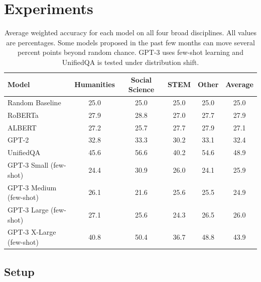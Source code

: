 \documentclass{article}
\begin{document}
\section{Experiments}

\begin{table}[b]
\setlength{\tabcolsep}{9pt}
\vspace{-5pt}
\fontsize{10}{11}\selectfont
\centering
\begin{tabular}{lcccc|c}
Model       & Humanities & Social Science & STEM & Other &  Average \\
\hline
Random Baseline & 25.0 & 25.0 & 25.0 & 25.0 & 25.0 \\
RoBERTa           & 27.9 & 28.8 & 27.0 & 27.7 & 27.9 \\
ALBERT           & 27.2 & 25.7 & 27.7 & 27.9 & 27.1 \\
GPT-2           & 32.8 & 33.3 & 30.2 & 33.1 & 32.4 \\
UnifiedQA       & 45.6 & 56.6 & 40.2 & 54.6 & 48.9 \\
GPT-3 Small (few-shot)     & 24.4 & 30.9 & 26.0 & 24.1 & 25.9 \\
GPT-3 Medium (few-shot)   & 26.1 & 21.6 & 25.6 & 25.5 & 24.9 \\
GPT-3 Large (few-shot)     & 27.1 & 25.6 & 24.3 & 26.5 & 26.0 \\
GPT-3 X-Large (few-shot)   & 40.8 & 50.4 & 36.7 & 48.8 & 43.9 \\
\hline
\end{tabular}
\caption{Average weighted accuracy for each model on all four broad disciplines. All values are percentages. Some models proposed in the past few months can move several percent points beyond random chance. GPT-3 uses few-shot learning and UnifiedQA is tested under distribution shift.}
\label{tab:mainresults}
\end{table}

\subsection{Setup}
\end{document}
